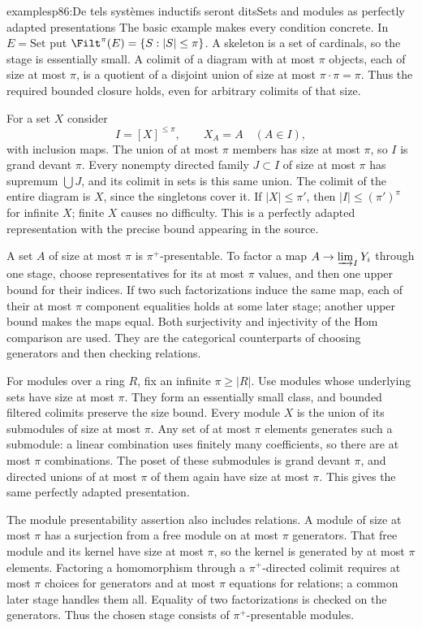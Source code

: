 \begin{dcomment}{examples}{p86:De tels systèmes inductifs seront dits}{Sets and modules as perfectly adapted presentations}
The basic example makes every condition concrete. In $E=\mathrm{Set}$ put $\Filt^\pi(E)=\{S:|S|\leq\pi\}$. A skeleton is a set of cardinals, so the stage is essentially small. A colimit of a diagram with at most $\pi$ objects, each of size at most $\pi$, is a quotient of a disjoint union of size at most $\pi\cdot\pi=\pi$. Thus the required bounded closure holds, even for arbitrary colimits of that size.

For a set $X$ consider
\[
 I=[X]^{\leq\pi},\qquad X_A=A\quad(A\in I),
\]
with inclusion maps. The union of at most $\pi$ members has size at most $\pi$, so $I$ is grand devant $\pi$. Every nonempty directed family $J\subset I$ of size at most $\pi$ has supremum $\bigcup J$, and its colimit in sets is this same union. The colimit of the entire diagram is $X$, since the singletons cover it. If $|X|\leq\pi'$, then $|I|\leq(\pi')^\pi$ for infinite $X$; finite $X$ causes no difficulty. This is a perfectly adapted representation with the precise bound appearing in the source.

A set $A$ of size at most $\pi$ is $\pi^+$-presentable. To factor a map $A\to\varinjlim_IY_i$ through one stage, choose representatives for its at most $\pi$ values, and then one upper bound for their indices. If two such factorizations induce the same map, each of their at most $\pi$ component equalities holds at some later stage; another upper bound makes the maps equal. Both surjectivity and injectivity of the Hom comparison are used. They are the categorical counterparts of choosing generators and then checking relations.

For modules over a ring $R$, fix an infinite $\pi\geq|R|$. Use modules whose underlying sets have size at most $\pi$. They form an essentially small class, and bounded filtered colimits preserve the size bound. Every module $X$ is the union of its submodules of size at most $\pi$. Any set of at most $\pi$ elements generates such a submodule: a linear combination uses finitely many coefficients, so there are at most $\pi$ combinations. The poset of these submodules is grand devant $\pi$, and directed unions of at most $\pi$ of them again have size at most $\pi$. This gives the same perfectly adapted presentation.

The module presentability assertion also includes relations. A module of size at most $\pi$ has a surjection from a free module on at most $\pi$ generators. That free module and its kernel have size at most $\pi$, so the kernel is generated by at most $\pi$ elements. Factoring a homomorphism through a $\pi^+$-directed colimit requires at most $\pi$ choices for generators and at most $\pi$ equations for relations; a common later stage handles them all. Equality of two factorizations is checked on the generators. Thus the chosen stage consists of $\pi^+$-presentable modules.


\end{dcomment}

